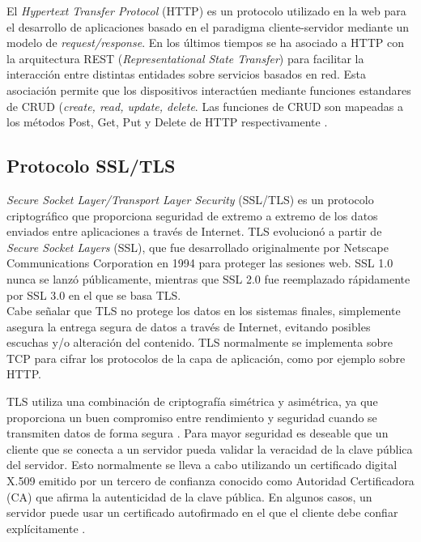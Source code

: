El \textit{Hypertext Transfer Protocol} (HTTP)\citep{http:1} es un protocolo utilizado en la web para el desarrollo de aplicaciones basado en el paradigma cliente-servidor mediante un modelo de \textit{request/response}. En los últimos tiempos se ha asociado a HTTP con la arquitectura REST (\textit{Representational State Transfer})\citep{rest} para facilitar la interacción entre distintas entidades sobre servicios basados en red. Esta asociación permite que los dispositivos interactúen mediante funciones estandares de CRUD (\textit{create, read, update, delete}\citep{10.1145/3292674}. Las funciones de CRUD son mapeadas a los métodos Post, Get, Put y Delete de HTTP respectivamente \citep{GLAROUDIS2020107037}. 

\subsection{Protocolo SSL/TLS}
\label{sec:Protocolo SSL/TLS}
\textit{Secure Socket Layer/Transport Layer Security} (SSL/TLS) \citep{tls:1} es un protocolo criptográfico que proporciona seguridad de extremo a extremo de los datos enviados entre aplicaciones a través de Internet.
TLS evolucionó a partir de \textit{Secure Socket Layers} (SSL), que fue desarrollado originalmente por Netscape Communications Corporation en 1994 para proteger las sesiones web. SSL 1.0 nunca se lanzó públicamente, mientras que SSL 2.0 fue reemplazado rápidamente por SSL 3.0 en el que se basa TLS.\\

Cabe señalar que TLS no protege los datos en los sistemas finales, simplemente asegura la entrega segura de datos a través de Internet, evitando posibles escuchas y/o alteración del contenido.
TLS normalmente se implementa sobre TCP \citep{rfc793} para cifrar los protocolos de la capa de aplicación, como por ejemplo sobre HTTP.

TLS utiliza una combinación de criptografía simétrica y asimétrica, ya que proporciona un buen compromiso entre rendimiento y seguridad cuando se transmiten datos de forma segura \citep{tls:2}. Para mayor seguridad es deseable que un cliente que se conecta a un servidor pueda validar la veracidad de la clave pública del servidor. Esto normalmente se lleva a cabo utilizando un certificado digital X.509 \citep{x509:1} emitido por un tercero de confianza conocido como Autoridad Certificadora (CA) que afirma la autenticidad de la clave pública. En algunos casos, un servidor puede usar un certificado autofirmado en el que el cliente debe confiar explícitamente \citep{tls:2}.

